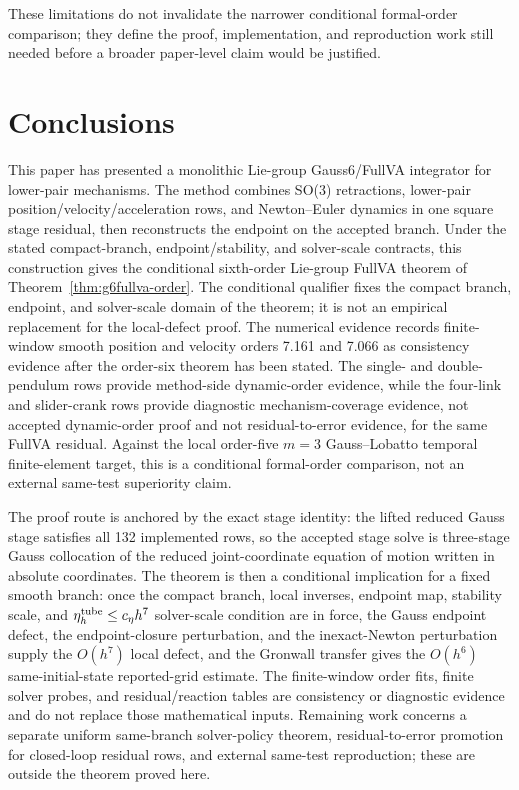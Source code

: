 \documentclass[preprint,12pt]{elsarticle}
\begin{document}
These limitations do not invalidate the narrower conditional formal-order
comparison; they define the proof, implementation, and reproduction work still
needed before a broader paper-level claim would be justified.

\section{Conclusions}

This paper has presented a monolithic Lie-group Gauss6/FullVA integrator for
lower-pair mechanisms. The method combines SO(3) retractions, lower-pair
position/velocity/acceleration rows, and Newton--Euler dynamics in one
square stage residual, then reconstructs the endpoint on the accepted
branch. Under the stated compact-branch, endpoint/stability,
and solver-scale contracts, this construction gives the
conditional sixth-order Lie-group FullVA theorem of
Theorem~\ref{thm:g6fullva-order}. The conditional qualifier fixes the compact
branch, endpoint, and solver-scale domain of the
theorem; it is not an empirical replacement for the local-defect proof. The
numerical evidence records finite-window smooth position and velocity orders
7.161 and 7.066 as consistency evidence after the order-six theorem has been
stated. The single- and double-pendulum rows provide
method-side dynamic-order evidence, while the four-link and slider-crank rows
provide diagnostic mechanism-coverage evidence, not accepted dynamic-order
proof and not residual-to-error evidence, for the same FullVA residual.
Against the
local order-five $m=3$ Gauss--Lobatto temporal finite-element target, this is
a conditional formal-order comparison, not an external same-test superiority
claim.

The proof route is anchored by the exact stage identity: the lifted reduced
Gauss stage satisfies all 132 implemented rows, so the accepted stage solve
is three-stage Gauss collocation of the reduced joint-coordinate equation of
motion written in absolute coordinates. The theorem is then a conditional
implication for a fixed smooth branch: once the compact branch, local
inverses, endpoint map, stability scale, and
\(\eta_h^{\rm tube}\le c_\eta h^7\) solver-scale condition are in force,
the Gauss endpoint defect, the endpoint-closure perturbation, and the
inexact-Newton perturbation supply the \(O(h^7)\) local defect, and the
Gronwall transfer gives the \(O(h^6)\) same-initial-state reported-grid
estimate. The finite-window order fits, finite solver probes, and
residual/reaction tables are consistency or diagnostic evidence and do not
replace those mathematical inputs. Remaining work concerns a separate
uniform same-branch solver-policy theorem, residual-to-error promotion for
closed-loop residual rows, and external same-test reproduction; these are
outside the theorem proved here.
\end{document}

